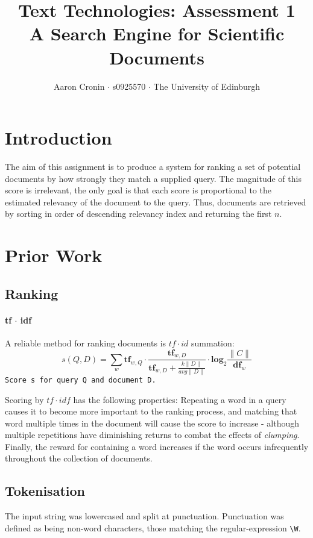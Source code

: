 \documentclass[10pt, a4paper, twocolumn]{article}   	%
\title{Text Technologies: Assessment 1 \\
A Search Engine for Scientific Documents}
\author{Aaron Cronin $\cdot$ s0925570 $\cdot$ The University of Edinburgh}
\date	{}						%
\begin{document}
\maketitle
\section{Introduction}
The aim of this assignment is to produce a system for ranking a set of potential documents by how strongly they match a supplied query. The magnitude of this score is irrelevant, the only goal is that each score is proportional to the estimated relevancy of the document to the query. Thus, documents are retrieved by sorting in order of descending relevancy index and returning the first $n$.
\section{Prior Work}
\subsection{Ranking}
\paragraph{tf $\cdot$ idf}
A reliable method for ranking documents is $tf \cdot id$ summation:
\begin{equation}
s(Q,D) = \sum_{w}\mathbf{tf}_{w, Q} \cdot \frac
{\mathbf{tf}_{w, D}}
{\mathbf{tf}_{w, D} + \frac{k \|D\|}{avg \|D\|}} \cdot \mathbf{log}_{2}\frac{\|C\|}{\mathbf{df}_{w}}
\end{equation}
\verb|Score s for query Q and document D.|

Scoring by $tf \cdot idf$ has the following properties: Repeating a word in a query causes it to become more important to the ranking process, and matching that word multiple times in the document will cause the score to increase - although multiple repetitions have diminishing returns to combat the effects of \emph{clumping}. Finally, the reward for containing a word increases if the word occurs infrequently throughout the collection of documents.

\subsection{Tokenisation}
The input string was lowercased and split at punctuation. Punctuation was defined as being non-word characters, those matching the regular-expression \verb|\W|.
\end{document}
